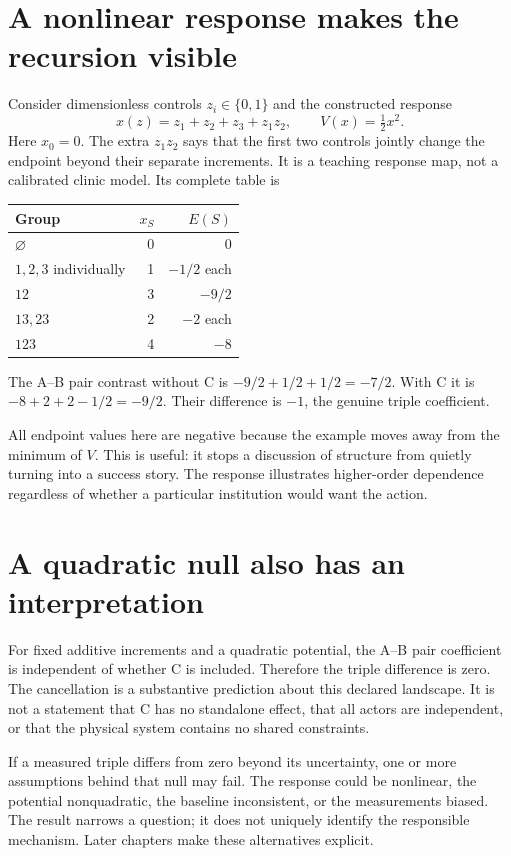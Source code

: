 \section{A nonlinear response makes the recursion visible}
Consider dimensionless controls $z_i\in\{0,1\}$ and the constructed response
\begin{equation}\label{eq:nonlinear-response-demo}
 x(z)=z_1+z_2+z_3+z_1z_2,\qquad V(x)=\tfrac12x^2.
\end{equation}
Here $x_0=0$. The extra $z_1z_2$ says that the first two controls jointly change the endpoint beyond their separate increments. It is a teaching response map, not a calibrated clinic model. Its complete table is
\begin{center}
\begin{tabular}{lrr}\toprule
Group & $x_S$ & $E(S)$\\\midrule
$\varnothing$ & 0 & 0\\
$1,2,3$ individually & 1 & $-1/2$ each\\
$12$ & 3 & $-9/2$\\
$13,23$ & 2 & $-2$ each\\
$123$ & 4 & $-8$\\\bottomrule
\end{tabular}
\end{center}
The A--B pair contrast without C is $-9/2+1/2+1/2=-7/2$. With C it is $-8+2+2-1/2=-9/2$. Their difference is $-1$, the genuine triple coefficient.

All endpoint values here are negative because the example moves away from the minimum of $V$. This is useful: it stops a discussion of structure from quietly turning into a success story. The response illustrates higher-order dependence regardless of whether a particular institution would want the action.

\section{A quadratic null also has an interpretation}
For fixed additive increments and a quadratic potential, the A--B pair coefficient is independent of whether C is included. Therefore the triple difference is zero. The cancellation is a substantive prediction about this declared landscape. It is not a statement that C has no standalone effect, that all actors are independent, or that the physical system contains no shared constraints.

If a measured triple differs from zero beyond its uncertainty, one or more assumptions behind that null may fail. The response could be nonlinear, the potential nonquadratic, the baseline inconsistent, or the measurements biased. The result narrows a question; it does not uniquely identify the responsible mechanism. Later chapters make these alternatives explicit.

